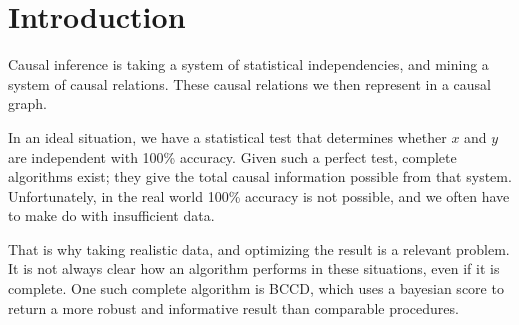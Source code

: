 \documentclass[11pt,a4paper]{report}
\begin{document}
\tableofcontents

\chapter{Introduction}\label{introduction}
Causal inference is taking a system of statistical independencies, and
mining a system of causal relations. These causal relations we then
represent in a causal graph.

In an ideal situation, we have a statistical test that determines
whether $x$ and $y$ are independent with 100\% accuracy. Given such a
perfect test, complete algorithms exist; they give the total causal
information possible from that system. Unfortunately, in the real world
100\% accuracy is not possible, and we often have to make do with
insufficient data.

That is why taking realistic data, and optimizing the result is a relevant
problem. It is not always clear how an algorithm performs in these
situations, even if it is complete. One such complete algorithm is
BCCD\cite{claassenBayesianApproachConstraint2012a}, which uses a bayesian
score to return a more robust and informative result than comparable
procedures.

\end{document}
